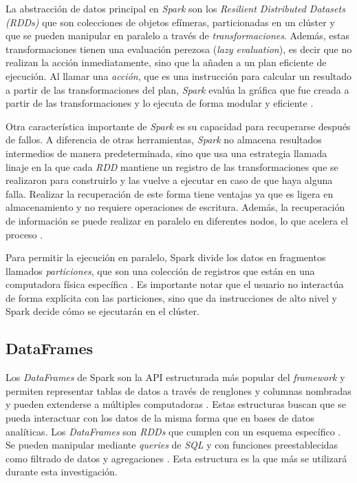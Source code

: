 La abstracción de datos principal en \textit{Spark} son los \textit{Resilient Distributed Datasets (RDDs)} que son colecciones de objetos efímeras, particionadas en un clúster y que se pueden manipular en paralelo a través de \textit{transformaciones}. Además, estas transformaciones tienen una evaluación perezosa (\textit{lazy evaluation}), es decir que no realizan la acción inmediatamente, sino que la añaden a un plan eficiente de ejecución. Al llamar una \textit{acción}, que es una instrucción para calcular un resultado a partir de las transformaciones del plan, \textit{Spark} evalúa la gráfica que fue creada a partir de las transformaciones y lo ejecuta de forma modular y eficiente \cite{sparkberkeley}.

Otra característica importante de \textit{Spark} es su capacidad para recuperarse después de fallos. A diferencia de otras herramientas, \textit{Spark} no almacena resultados intermedios de manera predeterminada, sino que usa una estrategia llamada linaje en la que cada \textit{RDD} mantiene un registro de las transformaciones que se realizaron para construirlo y las vuelve a ejecutar en caso de que haya alguna falla. Realizar la recuperación de este forma tiene ventajas ya que es ligera en almacenamiento y no requiere operaciones de escritura. Además, la recuperación de información se puede realizar en paralelo en diferentes nodos, lo que acelera el proceso \cite{sparkberkeley}.

Para permitir la ejecución en paralelo, Spark divide los datos en fragmentos llamados \textit{particiones}, que son una colección de registros que están en una computadora física específica \cite{sparkguide}. Es importante notar que el usuario no interactúa de forma explícita con las particiones, sino que da instrucciones de alto nivel y Spark decide cómo se ejecutarán en el clúster.

\subsection{DataFrames}

Los \textit{DataFrames} de Spark son la API estructurada más popular del \textit{framework} y permiten representar tablas de datos a través de renglones y columnas nombradas y pueden extenderse a múltiples computadoras \cite{sparkguide}. Estas estructuras buscan que se pueda interactuar con los datos de la misma forma que en bases de datos analíticas. Los \textit{DataFrames} son \textit{RDDs} que cumplen con un esquema específico \cite{sparkberkeley}. Se pueden manipular mediante \textit{queries} de \textit{SQL} y con funciones preestablecidas como filtrado de datos y agregaciones \cite{sparkberkeley}. Esta estructura es la que más se utilizará durante esta investigación.

